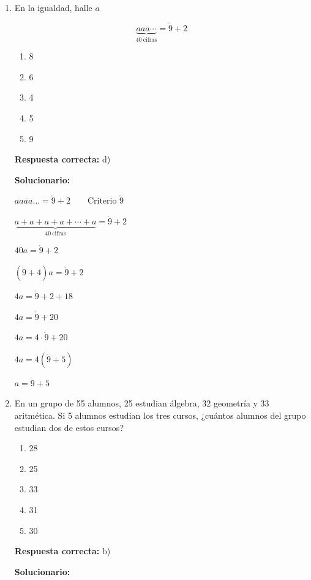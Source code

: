 \begin{enumerate}
	
	\vspace{6mm}
	
	\item En la igualdad, halle $a$
	
	$$\overline{\underbrace{aaa\cdots}_{40\ \text{cifras}}}=\mathring{9}
	+2$$
	
	\begin{enumerate}[label=\alph*)]
		\item 8
		\item 6
		\item 4
		\item 5
		\item 9
	\end{enumerate}
	\textbf{Respuesta correcta:} d)
	
	\vspace{2mm}
	\textbf{Solucionario:}
	
	$\overline{aaaa\ldots}=\mathring{9}+2 \qquad \text{Criterio $\mathring{9}$}$
	
	$\underbrace{a+a+a+a+\cdots+a}_{40\ \text{cifras}}=\mathring{9}+2$
	
	$40a=\mathring{9}+2$
	
	$(\mathring{9}+4)a=\mathring{9}+2$
	
	$4a=\mathring{9}+2+18$
	
	$4a=\mathring{9}+20$
	
	$4a=4\cdot \mathring{9}+20$
	
	$4a=4(\mathring{9}+5)$
	
	$a=\mathring{9}+5$
	
	
	
	\vspace{6mm}
	
	\item En un grupo de 55 alumnos, 25 estudian álgebra, 32 geometría y 33 aritmética. Si 5 alumnos estudian los tres cursos, ¿cuántos alumnos del grupo estudian dos de estos cursos?
	\begin{enumerate}[label=\alph*)]
		\item 28
		\item 25
		\item 33
		\item 31
		\item 30
	\end{enumerate}
	\textbf{Respuesta correcta:} b)
	
	\vspace{2mm}
	\textbf{Solucionario:}
	

\end{enumerate}
